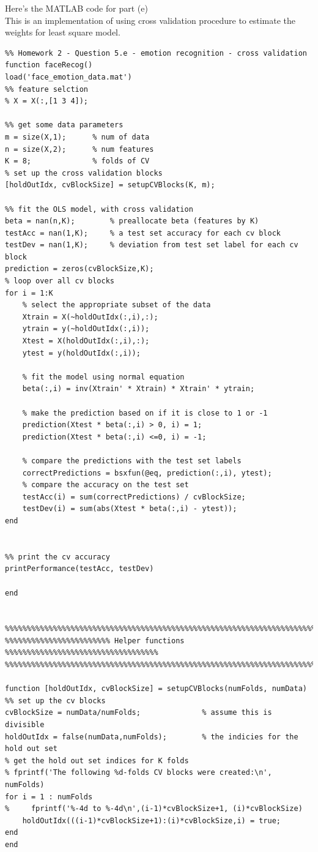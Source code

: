 \documentclass[paper=a4, fontsize=11pt]{scrartcl} %
\numberwithin{equation}{section} %
\numberwithin{figure}{section} %
\numberwithin{table}{section} %
\begin{document}
\newpage
Here's the MATLAB code for part (e) \\
This is an implementation of using cross validation procedure to estimate the weights for least square model.  \\
\begin{lstlisting}
%% Homework 2 - Question 5.e - emotion recognition - cross validation 
function faceRecog()
load('face_emotion_data.mat')
%% feature selction 
% X = X(:,[1 3 4]);

%% get some data parameters 
m = size(X,1);      % num of data
n = size(X,2);      % num features
K = 8;              % folds of CV
% set up the cross validation blocks 
[holdOutIdx, cvBlockSize] = setupCVBlocks(K, m);

%% fit the OLS model, with cross validation 
beta = nan(n,K);        % preallocate beta (features by K)
testAcc = nan(1,K);     % a test set accuracy for each cv block
testDev = nan(1,K);     % deviation from test set label for each cv block
prediction = zeros(cvBlockSize,K); 
% loop over all cv blocks 
for i = 1:K 
    % select the appropriate subset of the data
    Xtrain = X(~holdOutIdx(:,i),:);
    ytrain = y(~holdOutIdx(:,i));
    Xtest = X(holdOutIdx(:,i),:);
    ytest = y(holdOutIdx(:,i));
    
    % fit the model using normal equation 
    beta(:,i) = inv(Xtrain' * Xtrain) * Xtrain' * ytrain;
    
    % make the prediction based on if it is close to 1 or -1 
    prediction(Xtest * beta(:,i) > 0, i) = 1;
    prediction(Xtest * beta(:,i) <=0, i) = -1;
    
    % compare the predictions with the test set labels
    correctPredictions = bsxfun(@eq, prediction(:,i), ytest);
    % compare the accuracy on the test set
    testAcc(i) = sum(correctPredictions) / cvBlockSize;
    testDev(i) = sum(abs(Xtest * beta(:,i) - ytest));
end


%% print the cv accuracy
printPerformance(testAcc, testDev)

end


%%%%%%%%%%%%%%%%%%%%%%%%%%%%%%%%%%%%%%%%%%%%%%%%%%%%%%%%%%%%%%%%%%%%%%%%%%%%%
%%%%%%%%%%%%%%%%%%%%%%%% Helper functions %%%%%%%%%%%%%%%%%%%%%%%%%%%%%%%%%%%
%%%%%%%%%%%%%%%%%%%%%%%%%%%%%%%%%%%%%%%%%%%%%%%%%%%%%%%%%%%%%%%%%%%%%%%%%%%%%

function [holdOutIdx, cvBlockSize] = setupCVBlocks(numFolds, numData)
%% set up the cv blocks
cvBlockSize = numData/numFolds;              % assume this is divisible
holdOutIdx = false(numData,numFolds);        % the indicies for the hold out set
% get the hold out set indices for K folds
% fprintf('The following %d-folds CV blocks were created:\n', numFolds)
for i = 1 : numFolds
%     fprintf('%-4d to %-4d\n',(i-1)*cvBlockSize+1, (i)*cvBlockSize)
    holdOutIdx(((i-1)*cvBlockSize+1):(i)*cvBlockSize,i) = true;
end
end


\end{lstlisting}
\end{document}
